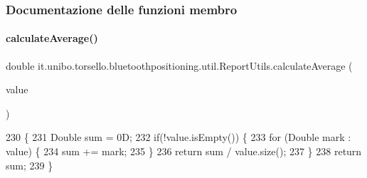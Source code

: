 \subsubsection{Documentazione delle funzioni membro}
\hypertarget{classit_1_1unibo_1_1torsello_1_1bluetoothpositioning_1_1util_1_1ReportUtils_a3585d9c21128af8bb2befe5cf069ba1e_a3585d9c21128af8bb2befe5cf069ba1e}{}\label{classit_1_1unibo_1_1torsello_1_1bluetoothpositioning_1_1util_1_1ReportUtils_a3585d9c21128af8bb2befe5cf069ba1e_a3585d9c21128af8bb2befe5cf069ba1e} 
\paragraph{\texorpdfstring{calculate\+Average()}{calculateAverage()}}
{\footnotesize\ttfamily double it.\+unibo.\+torsello.\+bluetoothpositioning.\+util.\+Report\+Utils.\+calculate\+Average (\begin{DoxyParamCaption}\item[{Array\+List$<$ Double $>$}]{value }\end{DoxyParamCaption})\hspace{0.3cm}{\ttfamily [private]}}


\begin{DoxyCode}
230                                                              \{
231         Double sum = 0D;
232         \textcolor{keywordflow}{if}(!value.isEmpty()) \{
233             \textcolor{keywordflow}{for} (Double mark : value) \{
234                 sum += mark;
235             \}
236             \textcolor{keywordflow}{return} sum / value.size();
237         \}
238         \textcolor{keywordflow}{return} sum;
239     \}
\end{DoxyCode}
\hypertarget{classit_1_1unibo_1_1torsello_1_1bluetoothpositioning_1_1util_1_1ReportUtils_aa83960dff58c2975a142c6b093abf72a_aa83960dff58c2975a142c6b093abf72a}{}\label{classit_1_1unibo_1_1torsello_1_1bluetoothpositioning_1_1util_1_1ReportUtils_aa83960dff58c2975a142c6b093abf72a_aa83960dff58c2975a142c6b093abf72a} 
